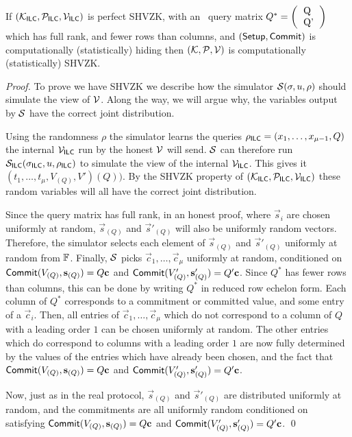 \begin{theorem}[SHVZK]
If $(\mathcal{K}_{\mathsf{ILC}},\mathcal{P}_{\mathsf{ILC}},\mathcal{V}_{\mathsf{ILC}})$ is perfect SHVZK, with an \ILC\ query matrix $Q^* = \left(\begin{tabular}{l} Q \\ Q' \end{tabular}\right)$ which has full rank, and fewer rows than columns, and $(\mathsf{Setup},\mathsf{Commit})$ is computationally (statistically) hiding then $(\mathcal{K},\mathcal{P},\mathcal{V})$ is computationally (statistically) SHVZK.
\end{theorem}
\begin{proof}
To prove we have SHVZK we describe how the simulator $\mathcal{S}(\mathsf{\sigma},u,\rho)$ should simulate the view of $\mathcal{V}$. Along the way, we will argue why, the variables output by $\mathcal{S}$ have the correct joint distribution.

Using the randomness $\rho$ the simulator learns the queries $\rho_{\mathsf{ILC}}=(x_1,\ldots,x_{\mu-1},Q)$ the internal $\mathcal{V}_{\mathsf{ILC}}$ run by the honest $\mathcal{V}$ will send. $\mathcal{S}$ can therefore run $\mathcal{S}_{\mathsf{ILC}}(\mathsf{\sigma}_{\mathsf{ILC}},u,\rho_{\mathsf{ILC}})$ to simulate the view of the internal $\mathcal{V}_{\mathsf{ILC}}$. This gives it $(t_1,\ldots,t_\mu,V_{(Q)},V'){(Q)})$. By the SHVZK property of $(\mathcal{K}_{\mathsf{ILC}},\mathcal{P}_{\mathsf{ILC}},\mathcal{V}_{\mathsf{ILC}})$ these random variables will all have the correct joint distribution. 

Since the query matrix has full rank, in an honest proof, where $\vec{s}_i$ are chosen uniformly at random, $\vec{s}_{(Q)}$ and $\vec{s}'_{(Q)}$ will also be uniformly random vectors. Therefore, the simulator selects each element of $\vec{s}_{(Q)}$ and $\vec{s}'_{(Q)}$ uniformly at random from $\mathbb{F}$. Finally, $\mathcal{S}$ picks $\vec{c}_1,\ldots,\vec{c}_\mu$ uniformly at random, conditioned on $\mathsf{Commit}(V_{(Q)},\mathbf{s}_{(Q)}) = Q \mathbf{c}$ and $\mathsf{Commit}(V'_{(Q)},\mathbf{s}'_{(Q)}) = Q' \mathbf{c}$. Since $Q^*$ has fewer rows than columns, this can be done by writing $Q^*$ in reduced row echelon form. Each column of $Q^*$ corresponds to a commitment or committed value, and some entry of a $\vec{c}_i$. Then, all entries of $\vec{c}_1,\ldots,\vec{c}_\mu$ which do not correspond to a column of $Q$ with a leading order $1$ can be chosen uniformly at random. The other entries which do correspond to columns with a leading order $1$ are now fully determined by the values of the entries which have already been chosen, and the fact that $\mathsf{Commit}(V_{(Q)},\mathbf{s}_{(Q)}) = Q \mathbf{c}$ and $\mathsf{Commit}(V'_{(Q)},\mathbf{s}'_{(Q)}) = Q' \mathbf{c}$.

Now, just as in the real protocol, $\vec{s}_{(Q)}$ and $\vec{s}'_{(Q)}$ are distributed uniformly at random, and the commitments are all uniformly random conditioned on satisfying $\mathsf{Commit}(V_{(Q)},\mathbf{s}_{(Q)}) = Q \mathbf{c}$ and $\mathsf{Commit}(V'_{(Q)},\mathbf{s}'_{(Q)}) = Q' \mathbf{c}$.
\qed
\end{proof}

